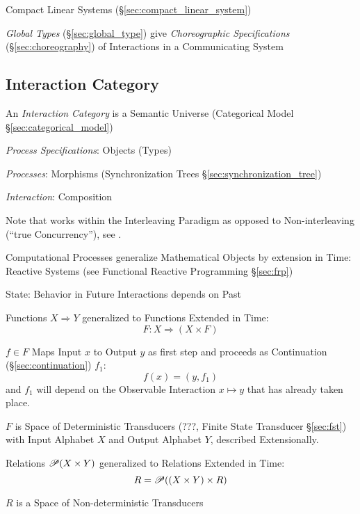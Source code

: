Compact Linear Systems (\S\ref{sec:compact_linear_system})

\cite{abramsky-gay-nagarajan96}

\fist \emph{Global Types} (\S\ref{sec:global_type}) give
\emph{Choreographic Specifications} (\S\ref{sec:choreography}) of
Interactions in a Communicating System



\subsection{Interaction Category}\label{sec:interaction_category}
\cite{abramsky-gay-nagarajan96}

An \emph{Interaction Category} is a Semantic Universe (Categorical
Model \S\ref{sec:categorical_model})

\emph{Process Specifications}: Objects (Types)

\emph{Processes}: Morphisms (Synchronization Trees
\S\ref{sec:synchronization_tree})

\emph{Interaction}: Composition

\fist Note that \cite{abramsky-gay-nagarajan96} works within the
Interleaving Paradigm as opposed to Non-interleaving (``true
Concurrency''), see \cite{winskel-nielsen93}.

Computational Processes generalize Mathematical Objects by extension
in Time: Reactive Systems (see Functional Reactive Programming
\S\ref{sec:frp})

State: Behavior in Future Interactions depends on Past

Functions $X \Rightarrow Y$ generalized to Functions Extended in Time:
\[
  F : X \Rightarrow (X \times F)
\]

$f \in F$ Maps Input $x$ to Output $y$ as first step and proceeds as
Continuation (\S\ref{sec:continuation}) $f_1$:
\[
  f(x) = (y,f_1)
\]
and $f_1$ will depend on the Observable Interaction $x \mapsto y$ that
has already taken place.

$F$ is Space of Deterministic Transducers (???, Finite State
Transducer \S\ref{sec:fst}) with Input Alphabet $X$ and Output
Alphabet $Y$, described Extensionally.

Relations $\mathscr{P}(X \times Y)$ generalized to Relations Extended in
Time:
\[
  R = \mathscr{P}((X \times Y) \times R)
\]

$R$ is a Space of Non-deterministic Transducers

